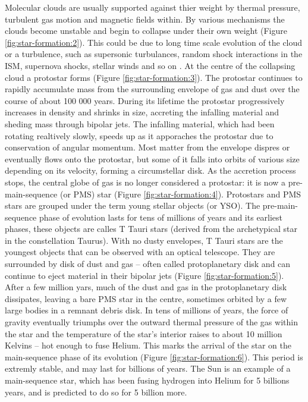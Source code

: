 Molecular clouds are usually supported against thier weight by thermal pressure, turbulent gas motion and magnetic fields within. By various mechanisms the clouds become unstable and begin to collapse under their own weight (Figure \ref{fig:star-formation:2}). This could be due to long time scale evolution of the cloud or a turbulence, such as supersonic turbulances, random shock interactions in the ISM, supernova shocks, stellar winds and so on \citep{Bodenheimer2011}. At the centre of the collapsing cloud a protostar forms (Figure \ref{fig:star-formation:3}). The protostar continues to  rapidly accumulate mass from the surrounding envelope of gas and dust over the course of about 100 000 years. During its lifetime the protostar progressively increases in density and shrinks in size, accreting the infalling material and sheding mass through bipolar jets. The infalling material, which had been rotating realtively slowly, speeds up as it apporaches the protostar due to conservation of angular momentum. Most matter from the envelope dispres or eventually flows onto the protostar, but some of it falls into orbits of various size depending on its velocity, forming a circumstellar disk. As the accretion process stops, the central globe of gas is no longer considered a protostar: it is now a pre-main-sequence (or PMS) star (Figure \ref{fig:star-formation:4}). Protostars and PMS stars are grouped under the term young stellar objects (or YSO). The pre-main-sequence phase of evolution lasts for tens of millions of years and its earliest phases, these objects are calles T Tauri stars (derived from the archetypical star in the constellation Taurus). With no dusty envelopes, T Tauri stars are the youngest objects that can be observed with an optical telescope. They are surrounded by disk of dust and gas -- often called protoplanetary disk and can continue to eject material in their bipolar jets (Figure \ref{fig:star-formation:5}). After a few million yars, much of the dust and gas in the protoplanetary disk dissipates, leaving a bare PMS star in the centre, sometimes orbited by a few large bodies in a remnant debris disk. In tens of millions of years, the force of gravity eventually triumphs over the outward thermal pressure of the gas within the star and the temperature of the star's interior raises to about 10 million Kelvins -- hot enough to fuse Helium. This marks the arrival of the star on the main-sequence phase of its evolution (Figure \ref{fig:star-formation:6}). This period is extremly stable, and may last for billions of years. The Sun is an example of a main-sequence star, which has been fusing hydrogen into Helium for 5 billions years, and is predicted to do so for 5 billion more. 

